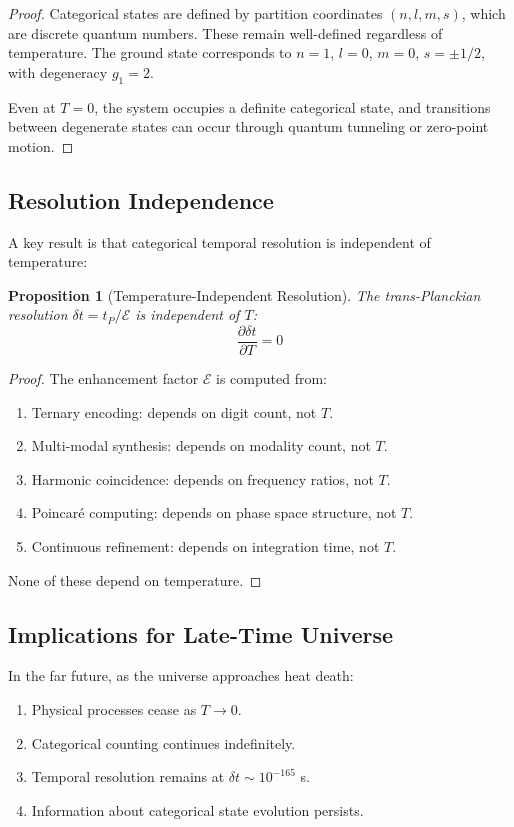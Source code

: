 \documentclass[twocolumn,10pt]{article}
\newtheorem{proposition}[theorem]{Proposition}
\begin{document}
\begin{proof}
Categorical states are defined by partition coordinates $(n, l, m, s)$, which are discrete quantum numbers. These remain well-defined regardless of temperature. The ground state corresponds to $n = 1$, $l = 0$, $m = 0$, $s = \pm 1/2$, with degeneracy $g_1 = 2$.

Even at $T = 0$, the system occupies a definite categorical state, and transitions between degenerate states can occur through quantum tunneling or zero-point motion.
\end{proof}

\subsection{Resolution Independence}

A key result is that categorical temporal resolution is independent of temperature:

\begin{proposition}[Temperature-Independent Resolution]
The trans-Planckian resolution $\delta t = t_P / \mathcal{E}$ is independent of $T$:
\begin{equation}
    \frac{\partial \delta t}{\partial T} = 0
\end{equation}
\end{proposition}

\begin{proof}
The enhancement factor $\mathcal{E}$ is computed from:
\begin{enumerate}
    \item Ternary encoding: depends on digit count, not $T$.
    \item Multi-modal synthesis: depends on modality count, not $T$.
    \item Harmonic coincidence: depends on frequency ratios, not $T$.
    \item Poincar\'{e} computing: depends on phase space structure, not $T$.
    \item Continuous refinement: depends on integration time, not $T$.
\end{enumerate}
None of these depend on temperature.
\end{proof}

\subsection{Implications for Late-Time Universe}

In the far future, as the universe approaches heat death:
\begin{enumerate}
    \item Physical processes cease as $T \to 0$.
    \item Categorical counting continues indefinitely.
    \item Temporal resolution remains at $\delta t \sim 10^{-165}$ s.
    \item Information about categorical state evolution persists.
\end{enumerate}
\end{document}
